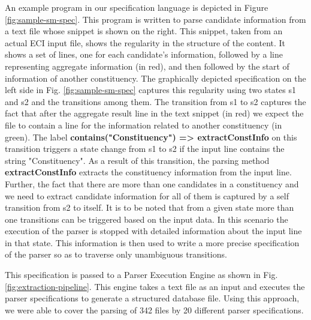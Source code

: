 An example program in our specification language is depicted in Figure \ref{fig:sample-sm-spec}. This program is written to parse candidate information from a text file whose snippet is shown on the right. This snippet, taken from an actual ECI input file, shows the regularity in the structure of the content. It shows a set of lines, one for each candidate's information, followed by a line representing aggregate information (in red), and then followed by the start of information of another constituency. The graphically depicted specification on the left side in Fig. \ref{fig:sample-sm-spec} captures this regularity using two states s1 and s2 and the transitions among them. The transition from s1 to s2 captures the fact that after the aggregate result line in the text snippet (in red) we expect the file to contain a line for the information related to another constituency (in green). The label \textbf{contains("Constituency") => extractConstInfo} on this transition triggers a state change from s1 to s2 if the input line contains the string "Constituency". As a result of this transition, the parsing method \textbf{extractConstInfo} extracts the constituency information from the input line. Further, the fact that there are more than one candidates in a constituency and we need to extract candidate information for all of them is captured by a self transition from s2 to itself. It is to be noted that from a given state more than one transitions can be triggered based on the input data. In this scenario the execution of the parser is stopped with detailed information about the input line in that state. This information is then used to write a more precise specification of the parser so as to traverse only unambiguous transitions.

This specification is passed to a Parser Execution Engine as shown in Fig. \ref{fig:extraction-pipeline}. 
This engine takes a text file as an input and executes the parser specifications to generate a structured database file. Using this approach, we were able to cover the parsing of 342 files by 20 different parser specifications.

